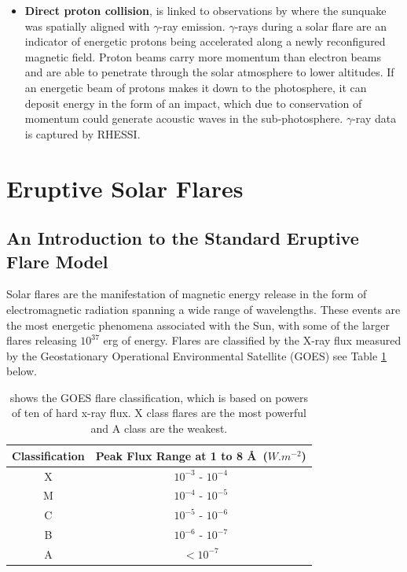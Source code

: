 \begin{itemize}
\item \textbf{Direct proton collision}, is linked to observations by \cite{2007ApJ...664..573Z} where the sunquake was spatially aligned with $\gamma$-ray emission. $\gamma$-rays during a solar flare are an indicator of energetic protons being accelerated along a newly reconfigured magnetic field. Proton beams carry more momentum than electron beams and are able to penetrate through the solar atmosphere to lower altitudes. If an energetic beam of protons makes it down to the photosphere, it can deposit energy in the form of an impact, which due to conservation of momentum could generate acoustic waves in the sub-photosphere. $\gamma$-ray data is captured by RHESSI. \\

\end{itemize}

\section{Eruptive Solar Flares}
\subsection{An Introduction to the Standard Eruptive Flare Model}

Solar flares are the manifestation of magnetic energy release in the form of electromagnetic radiation spanning a wide range of wavelengths. These events are the most energetic phenomena associated with the Sun, with some of the larger flares releasing $10^{37}$ erg of energy. Flares are classified by the X-ray flux measured by the Geostationary Operational Environmental Satellite (GOES) see Table \ref{goes} below. \\

\begin{table}[h]
\centering
\begin{tabular}{|c|c|}\label{GOES}
Classification & Peak Flux Range at 1 to 8 \AA\ ($W.m^{-2}$)\\
\hline
X & $10^{-3}$ - $10^{-4}$\\
M & $10^{-4}$ - $10^{-5}$\\
C & $10^{-5}$ - $10^{-6}$\\
B & $10^{-6}$ - $10^{-7}$\\
A & $<10^{-7}$\\
\end{tabular}
\caption{shows the GOES flare classification, which is based on powers of ten of hard x-ray flux. X class flares are the most powerful and A class are the weakest.}\label{goes}
\end{table}

